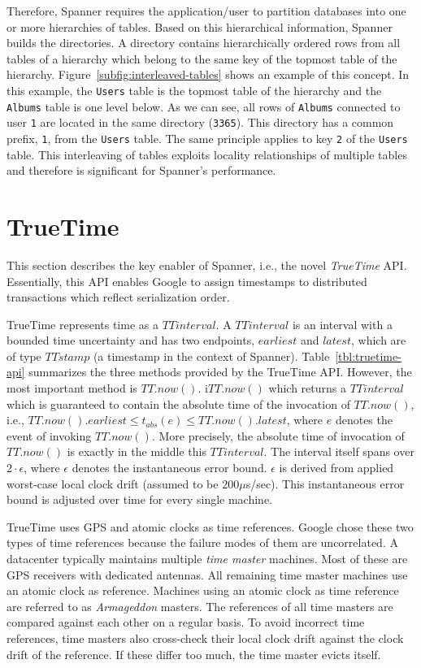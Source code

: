 \documentclass[onecolumn, a4paper, 10pt]{article}
\begin{document}
Therefore, Spanner requires the application/user to partition databases into
one or more hierarchies of tables. Based on this hierarchical information, Spanner
builds the directories. A directory contains hierarchically ordered rows from
all tables of a hierarchy which belong to the same key of the topmost table of
the hierarchy. Figure~\ref{subfig:interleaved-tables} shows an example of this
concept. In this example, the \texttt{Users} table is the topmost table of the
hierarchy and the \texttt{Albums} table is one level below. As we can see, all
rows of \texttt{Albums} connected to user \texttt{1} are located in the same
directory (\texttt{3365}). This directory has a common prefix, \texttt{1},
from the \texttt{Users} table. The same principle applies to key \texttt{2}
of the \texttt{Users} table. This interleaving of tables exploits locality
relationships of multiple tables and therefore is significant for Spanner's
performance.

\section{TrueTime}
\label{sec:truetime}

This section describes the key enabler of Spanner, i.e., the novel \emph{TrueTime}
API. Essentially, this API enables Google to assign timestamps to distributed
transactions which reflect serialization order.

TrueTime represents time as a $TTinterval$. A $TTinterval$ is an interval with a
bounded time uncertainty and has two endpoints, $earliest$ and $latest$, which
are of type $TTstamp$ (a timestamp in the context of Spanner).
Table~\ref{tbl:truetime-api} summarizes the three methods provided by the TrueTime
API. However, the most important method is $TT.now()$. i$TT.now()$ which returns
a $TTinterval$ which is guaranteed to contain the absolute time of the invocation
of $TT.now()$, i.e., $TT.now().earliest \leq t_{abs}(e) \leq TT.now().latest$,
where $e$ denotes the event of invoking $TT.now()$. More precisely, the absolute
time of invocation of $TT.now()$ is exactly in the middle this $TTinterval$. The
interval itself spans over $2\cdot\epsilon$, where $\epsilon$ denotes the
instantaneous error bound. $\epsilon$ is derived from applied worst-case local
clock drift (assumed to be $200\mu$s/sec). This instantaneous error bound is
adjusted over time for every single machine.

TrueTime uses GPS and atomic clocks as time references. Google chose these two
types of time references because the failure modes of them are uncorrelated. A
datacenter typically maintains multiple \emph{time master} machines. Most of
these are GPS receivers with dedicated antennas. All remaining time master
machines use an atomic clock as reference. Machines using an atomic clock as time
reference are referred to as \emph{Armageddon} masters. The references of all time
masters are compared against each other on a regular basis. To avoid incorrect
time references, time masters also cross-check their local clock drift against
the clock drift of the reference. If these differ too much, the time master evicts
itself.
\end{document}
